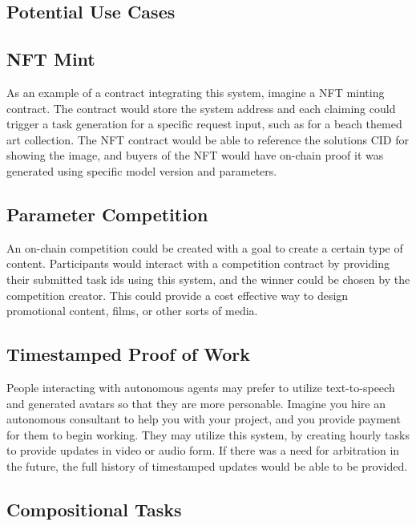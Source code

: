 \documentclass{article}
\begin{document}
\begin{appendices}

\section{Potential Use Cases}

\subsection{NFT Mint}

As an example of a contract integrating this system, imagine a NFT minting contract. The contract would store the system address and each claiming could trigger a task generation for a specific request input, such as for a beach themed art collection. The NFT contract would be able to reference the solutions CID for showing the image, and buyers of the NFT would have on-chain proof it was generated using specific model version and parameters.

\subsection{Parameter Competition}

An on-chain competition could be created with a goal to create a certain type of content. Participants would interact with a competition contract by providing their submitted task ids using this system, and the winner could be chosen by the competition creator. This could provide a cost effective way to design promotional content, films, or other sorts of media.

\subsection{Timestamped Proof of Work}

People interacting with autonomous agents may prefer to utilize text-to-speech and generated avatars so that they are more personable. Imagine you hire an autonomous consultant to help you with your project, and you provide payment for them to begin working. They may utilize this system, by creating hourly tasks to provide updates in video or audio form. If there was a need for arbitration in the future, the full history of timestamped updates would be able to be provided.

\subsection{Compositional Tasks}


\end{appendices}
\end{document}
